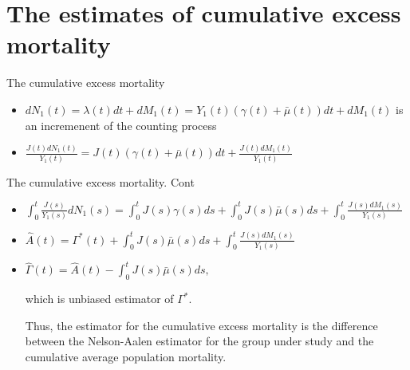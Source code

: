 \documentclass{beamer}
\begin{document}
\section{The estimates of cumulative excess mortality}
  \begin{frame}{The cumulative excess mortality}
 \begin{itemize} 
   \item $dN_1(t) = \lambda(t)dt + dM_1(t) = Y_1(t) (\gamma(t) + \bar\mu(t)) dt + dM_1(t)$ is an incremenent of the counting process
   \newline
   \item $\frac{J(t) dN_1(t)}{Y_1(t)} = J(t)(\gamma(t) + \bar\mu(t)) dt + \frac{J(t)dM_1(t)}{Y_1(t)}$
   \end{itemize}
\end{frame} 
   
   \begin{frame}{The cumulative excess mortality. Cont}
   \begin{itemize} 
   \item $\int_0^t \frac{J(s)}{Y_1(s)}dN_1(s) = \int_0^t J(s)\gamma(s) ds + \int_0^t J(s)\bar\mu(s)ds + \int_0^t \frac{J(s)dM_1(s)}{Y_1(s)}$
   \newline
   \item $\hat A(t) = \Gamma^*(t) + \int_0^t J(s)\bar\mu(s)ds + \int_0^t \frac{J(s)dM_1(s)}{Y_1(s)}$ 
   
   
   \item $\hat\Gamma(t) = \hat A(t) - \int_0^t J(s) \bar\mu(s) ds,$
   
   which is unbiased estimator of $\Gamma^*$.
   
  \newline
  \newline
   Thus, the estimator for the cumulative excess mortality is the difference between the Nelson-Aalen estimator for the group under study and the cumulative average population mortality.
  

   \end{itemize}
\end{frame}
\end{document}
